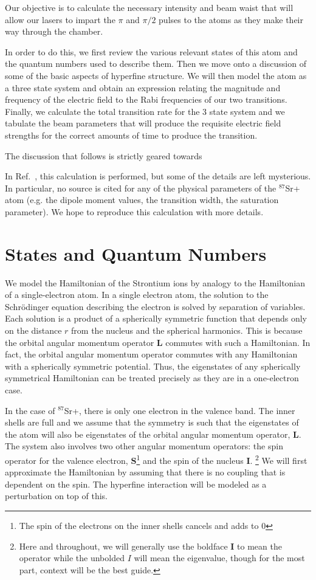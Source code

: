 Our objective is to calculate the necessary intensity and beam waist that will allow our lasers to impart the $\pi$ and $\pi/2$ pulses to the atoms as they make their way through the chamber. 

In order to do this, we first review the various relevant states of this atom and the quantum numbers used to describe them. Then we move onto a discussion of some of the basic aspects of hyperfine structure. We will then model the atom as a three state system and obtain an expression relating the magnitude and frequency of the electric field to the Rabi frequencies of our two transitions. Finally, we calculate the total transition rate for the 3 state system and we tabulate the beam parameters that will produce the requisite electric field strengths for the correct amounts of time to produce the transition.

The discussion that follows is strictly geared towards


In Ref.\ \cite{cjeDiss}, this calculation is performed, but some of the details are left mysterious. In particular, no source is cited for any of the physical parameters of the $^{87}$Sr+ atom (e.g. the dipole moment values, the transition width, the saturation parameter). We hope to reproduce this calculation with more details.  

\section{States and Quantum Numbers}

We model the Hamiltonian of the Strontium ions by analogy to the Hamiltonian of a single-electron atom. 
In a single electron atom, the solution to the Schr\"odinger equation describing the electron is solved by separation of variables.
 Each solution is a product of a spherically symmetric function that depends only on the distance $r$ from the nucleus and the spherical harmonics.
This is because the orbital angular momentum operator $\mathbf{L}$ commutes with such a Hamiltonian. In fact, the orbital angular momentum operator commutes with any Hamiltonian with a spherically symmetric potential.
Thus, the eigenstates of any spherically symmetrical Hamiltonian can be treated precisely as they are in a one-electron case. 

In the case of $^{87}$Sr+, there is only one electron in the valence band. The inner shells are full and we assume that the symmetry is such that the eigenstates of the atom will also be eigenstates of the orbital angular momentum operator, $\mathbf{L}$.
 The system also involves two other angular momentum operators: the spin operator for the valence electron, $\mathbf{S}$\footnote{The spin of the electrons on the inner shells cancels and adds to 0} and the spin of the nucleus $\mathbf{I}$.
\footnote{Here and throughout, we will generally use the boldface $\mathbf{I}$ to mean the operator while the unbolded $I$ will mean the eigenvalue, though for the most part, context will be the best guide.}
We will first approximate the Hamiltonian by assuming that there is no coupling that is dependent on the spin. 
The hyperfine interaction will be modeled as a perturbation on top of this.

